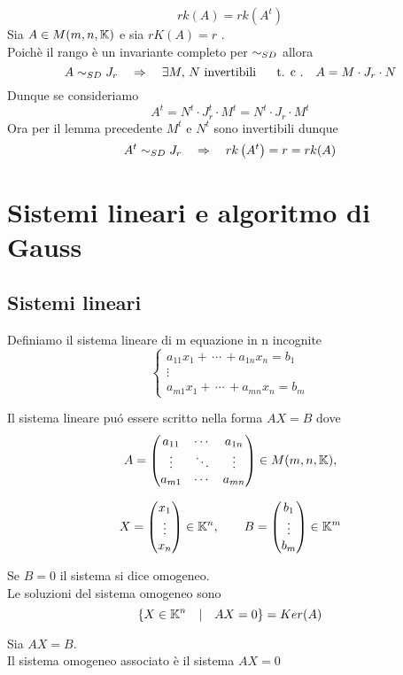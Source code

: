 \begin{cor}
$$ rk (A) = rk \left( A^t \right)$$
\proof
Sia $A \in M(m,n,\mathbb{K} )$ e sia $rK(A)=r $ .\\
Poich\`e il rango \`e un invariante completo per $\sim_{SD}$ allora  
$$ A \sim_{SD} J_r \quad \Rightarrow \quad  
 \exists M , \, N \text{ invertibili } \quad \text{ t. c .} \quad A = M\cdot J_r \cdot N  $$
Dunque se consideriamo 
$$  A^t  = N^t  \cdot J_r^t  \cdot  M^t  = N^t  \cdot  J_r \cdot   M^t   $$ 
Ora per il lemma precedente $ M^t$ e $N^t $ sono invertibili  dunque
 $$  A^t \sim_{SD} J_r \quad \Rightarrow \quad  rk\left( A^t \right)=r=rk(A)$$
\endproof
\end{cor}
\newpage
\section{Sistemi lineari e algoritmo di Gauss}
\subsection{Sistemi lineari}
\begin{defn}
Definiamo il sistema lineare di m equazione in n incognite
$$ \begin{cases}
a_{11} x_1 + \, \cdots \, + a_{1n}x_n=b_1 \\
\vdots \\ 
a_{m1} x_1 + \, \cdots \, + a_{mn}x_n=b_m 
\end{cases}$$
\end{defn}
\begin{oss}
Il sistema lineare pu\'o essere scritto nella forma $AX=B $ dove
$$ A= \begin{pmatrix}
a_{11} & \cdots & a_{1n}\\
\vdots & \ddots & \vdots \\
a_{m1} & \cdots & a_{mn}
\end{pmatrix} \in M( m,n , \mathbb{K} ) , $$ 

$$ X = \begin{pmatrix} x_1 \\ \vdots \\ x_n \end{pmatrix} \in \mathbb{K}^n ,\qquad B=\begin{pmatrix}
b_1\\ \vdots \\ b_m 
\end{pmatrix} \in \mathbb{K} ^ m $$
\end{oss}
\spazio
\begin{defn} Se $B=0$ il sistema si dice omogeneo.\\
Le soluzioni del sistema omogeneo sono
$$ \{ X \in \mathbb{K} ^n \quad \vert \quad AX=0 \} = Ker(A)$$
\end{defn}
\begin{defn} Sia $AX=B$.\\
Il sistema omogeneo associato \`e il sistema $AX=0$
\end{defn}

